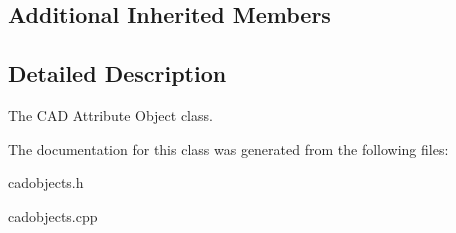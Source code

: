 \subsection*{Additional Inherited Members}


\subsection{Detailed Description}
The C\+AD Attribute Object class. 

The documentation for this class was generated from the following files\+:\begin{DoxyCompactItemize}
\item 
cadobjects.\+h\item 
cadobjects.\+cpp\end{DoxyCompactItemize}
